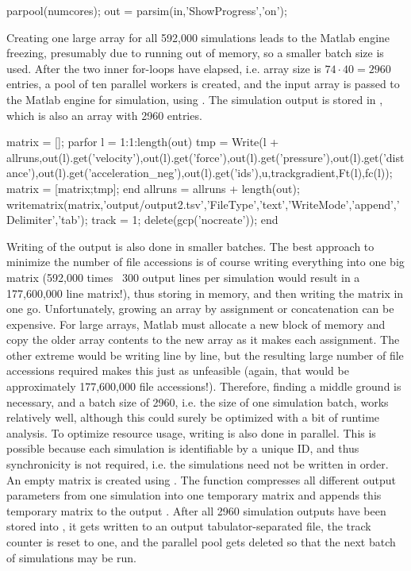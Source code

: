 \bigskip
\begin{python}
	parpool(numcores);
	out = parsim(in,'ShowProgress','on');
\end{python}
\bigskip

\noindent
Creating one large array for all 592,000 simulations leads to the Matlab engine freezing, presumably due to running out of memory, so a smaller batch size is used. After the two inner for-loops have elapsed, i.e. array size is $74 \cdot 40 = 2960$ entries, a pool of ten parallel workers is created, and the input array is passed to the Matlab engine for simulation, using . The simulation output is stored in , which is also an array with 2960 entries.

\bigskip
\begin{python}
	matrix = [];
	parfor l = 1:1:length(out)
		tmp = Write(l + allruns,out(l).get('velocity'),out(l).get('force'),out(l).get('pressure'),out(l).get('distance'),out(l).get('acceleration_neg'),out(l).get('ids'),u,trackgradient,Ft(l),fc(l));
		matrix = [matrix;tmp];
	end
	allruns = allruns + length(out);
	writematrix(matrix,'output/output2.tsv','FileType','text','WriteMode','append','Delimiter','tab');
	track = 1;
	delete(gcp('nocreate'));
end
\end{python}
\bigskip

\noindent
Writing of the output is also done in smaller batches. The best approach to minimize the number of file accessions is of course writing everything into one big matrix (592,000 times ~300 output lines per simulation would result in a 177,600,000 line matrix!), thus storing in memory, and then writing the matrix in one go. Unfortunately, growing an array by assignment or concatenation can be expensive. For large arrays, Matlab must allocate a new block of memory and copy the older array contents to the new array as it makes each assignment. The other extreme would be writing line by line, but the resulting large number of file accessions required makes this just as unfeasible (again, that would be approximately 177,600,000 file accessions!). Therefore, finding a middle ground is necessary, and a batch size of 2960, i.e. the size of one simulation batch, works relatively well, although this could surely be optimized with a bit of runtime analysis. To optimize resource usage, writing is also done in parallel. This is possible because each simulation is identifiable by a unique ID, and thus synchronicity is not required, i.e. the simulations need not be written in order. An empty matrix is created using . The  function compresses all different output parameters from one simulation into one temporary matrix  and appends this temporary matrix to the output . After all 2960 simulation outputs have been stored into , it gets written to an output tabulator-separated file, the track counter is reset to one, and the parallel pool gets deleted so that the next batch of simulations may be run.


